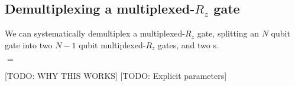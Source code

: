 \subsection{Demultiplexing a multiplexed-$R_z$ gate}
We can systematically demultiplex a multiplexed-$R_z$ gate, splitting an $N$ qubit gate into two $N-1$ qubit multiplexed-$R_z$ gates, and two s.
\begin{center}
$=$
\end{center}
[TODO: WHY THIS WORKS]
[TODO: Explicit parameters]



